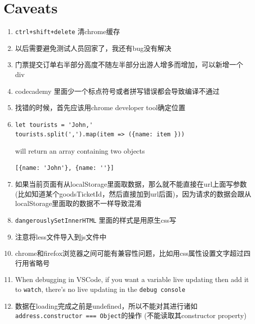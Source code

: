 \documentclass[a4paper, 12pt]{article}
\begin{document}
\section{Caveats}
\begin{enumerate}

\item \verb|ctrl+shift+delete| 清chrome缓存

\item 以后需要避免测试人员回家了，我还有bug没有解决

\item 门票提交订单右半部分高度不随左半部分出游人增多而增加，可以新增一个div

\item codecademy 里面少一个标点符号或者拼写错误都会导致编译不通过

\item 找错的时候，首先应该用chrome developer tool确定位置

\item 
\begin{verbatim}
let tourists = 'John,'
tourists.split(',').map(item => ({name: item }))
\end{verbatim}
will return an array containing two objects
\begin{verbatim}
[{name: 'John'}, {name: ''}]
\end{verbatim}

\item 如果当前页面有从localStorage里面取数据，那么就不能直接在url上面写参数 (比如知道某个goodsTicketId，然后直接加到url后面)，因为请求的数据会跟从localStorage里面取的数据不一样导致混淆

\item \verb|dangerouslySetInnerHTML| 里面的样式是用原生css写

\item 注意将less文件导入到js文件中

\item chrome和firefox浏览器之间可能有兼容性问题，比如用css属性设置文字超过四行用省略号

\item When debugging in VSCode, if you want a variable live updating then add it to \verb|watch|, there's no live updating in the \verb|debug console|

\item 数据在loading完成之前是undefined，所以不能对其进行诸如\\ \verb|address.constructor === Object|的操作 (不能读取其constructor property)


\end{enumerate}
\end{document}
